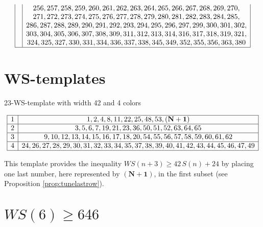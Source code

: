 \documentclass{article}
\newtheorem{computational theorem}[definition]{Computational Theorem}
\newcommand{\WS}{\mathit{WS}}
\begin{document}
\begin{table}[H]
\begin{center}
\begin{small}
\[\begin{array}{|*{2}{c|}}
	& 256, 257, 258, 259, 260, 261, 262, 263, 264, 265, 266, 267, 268, 269, 270,\\
	& 271, 272, 273, 274, 275, 276, 277, 278, 279, 280, 281, 282, 283, 284, 285,\\
	& 286, 287, 288, 289, 290, 291, 292, 293, 294, 295, 296, 297, 299, 300, 301, 302,\\
	& 303, 304, 305, 306, 307, 308, 309, 311, 312, 313, 314, 316, 317, 318, 319, 321,\\
	& 324, 325, 327, 330, 331, 334, 336, 337, 338, 345, 349, 352, 355, 356, 363, 380\\
	\hline
\end{array}
\]
\end{small}
\end{center}
\end{table}

\section{WS-templates}
\label{WS-templates}

\begin{table}[H]
{\footnotesize
	\caption{23-WS-template with width 42 and 4 colors}}
\begin{center}
\begin{small}
\[
\begin{array}{|*{2}{c|}}
	\hline
	1 & 1, 2, 4, 8, 11, 22, 25, 48, 53, \mathbf{(N+1)}\\
	\hline
	2 & 3, 5, 6, 7, 19, 21, 23, 36, 50, 51, 52, 63, 64, 65\\
	\hline
	3 & 9, 10, 12, 13, 14, 15, 16, 17, 18, 20, 54, 55, 56, 57, 58, 59, 60, 61, 62\\
	\hline
	4 & 24, 26, 27, 28, 29, 30, 31, 32, 33, 34, 35, 37, 38, 39, 40, 41, 42, 43, 44, 45, 46, 47, 49\\
	\hline
\end{array}
\]
\end{small}
\end{center}
\end{table}

This template provides the inequality \(\WS (n+3) \geqslant 42 \, S(n) + 24\)
by placing one last number, here represented by \(\mathbf{(N+1)}\), in the first subset (see Proposition \ref{prop:tunelastrow}).


\section{\(\WS(6) \geqslant 646\)}
\label{WS(6)}
\end{document}
